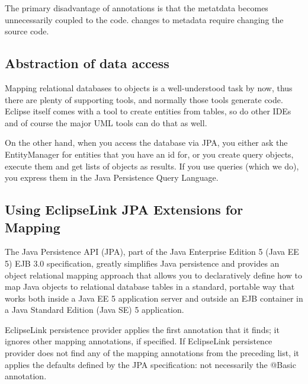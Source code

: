 The primary disadvantage of annotations is that the metatdata becomes unnecessarily coupled to the code. changes to metadata require changing the source code.

\subsection{Abstraction of data access}
Mapping relational databases to objects is a well-understood task by now, thus there are plenty of supporting tools, and normally those tools generate code. Eclipse itself comes with a tool to create entities from tables, so do other IDEs and of course the major UML tools can do that as well.

On the other hand, when you access the database via JPA, you either ask the EntityManager for entities that you have an id for, or you create query objects, execute them and get lists of objects as results. If you use queries (which we do), you express them in the Java Persistence Query Language.

\subsection{Using EclipseLink JPA Extensions for Mapping}
The Java Persistence API (JPA), part of the Java Enterprise Edition 5 (Java EE 5) EJB 3.0 specification, greatly simplifies Java persistence and provides an object relational mapping approach that allows you to declaratively define how to map Java objects to relational database tables in a standard, portable way that works both inside a Java EE 5 application server and outside an EJB container in a Java Standard Edition (Java SE) 5 application.

EclipseLink persistence provider applies the first annotation that it finds; it ignores other mapping annotations, if specified. If EclipseLink persistence provider does not find any of the mapping annotations from the preceding list, it applies the defaults defined by the JPA specification: not necessarily the @Basic annotation.

